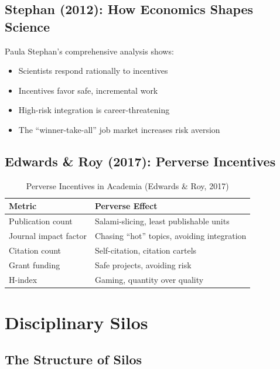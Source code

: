 \subsection{Stephan (2012): How Economics Shapes Science}

Paula Stephan's comprehensive analysis shows:
\begin{itemize}
\item Scientists respond rationally to incentives
\item Incentives favor safe, incremental work
\item High-risk integration is career-threatening
\item The ``winner-take-all'' job market increases risk aversion
\end{itemize}

\subsection{Edwards \& Roy (2017): Perverse Incentives}

\begin{table}[htbp]
\centering
\caption{Perverse Incentives in Academia (Edwards \& Roy, 2017)}
\label{tab:perverse}
\renewcommand{\arraystretch}{1.3}
\begin{tabular}{@{}ll@{}}
\toprule
\textbf{Metric} & \textbf{Perverse Effect} \\
\midrule
Publication count & Salami-slicing, least publishable units \\
Journal impact factor & Chasing ``hot'' topics, avoiding integration \\
Citation count & Self-citation, citation cartels \\
Grant funding & Safe projects, avoiding risk \\
H-index & Gaming, quantity over quality \\
\bottomrule
\end{tabular}
\end{table}



\section{Disciplinary Silos}
\label{sec:meta-silos}

\subsection{The Structure of Silos}

